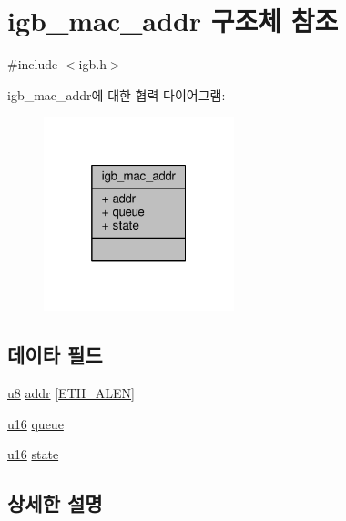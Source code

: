 \hypertarget{structigb__mac__addr}{}\section{igb\+\_\+mac\+\_\+addr 구조체 참조}
\label{structigb__mac__addr}


{\ttfamily \#include $<$igb.\+h$>$}



igb\+\_\+mac\+\_\+addr에 대한 협력 다이어그램\+:
\nopagebreak
\begin{figure}[H]
\begin{center}
\leavevmode
\includegraphics[width=157pt]{structigb__mac__addr__coll__graph}
\end{center}
\end{figure}
\subsection*{데이타 필드}
\begin{DoxyCompactItemize}
\item 
\hyperlink{lib_2igb_2e1000__osdep_8h_a8baca7e76da9e0e11ce3a275dd19130c}{u8} \hyperlink{structigb__mac__addr_ad0cb1fd890c452cd6b53222cc82474a4}{addr} \mbox{[}\hyperlink{avb__avtp_8h_a9822d89774e0d6ddaa06503950130423}{E\+T\+H\+\_\+\+A\+L\+EN}\mbox{]}
\item 
\hyperlink{lib_2igb_2e1000__osdep_8h_acdc9cf0314be0ae5a01d6d4379a95edd}{u16} \hyperlink{structigb__mac__addr_a4895577ef36597501c4510a0ff6cea06}{queue}
\item 
\hyperlink{lib_2igb_2e1000__osdep_8h_acdc9cf0314be0ae5a01d6d4379a95edd}{u16} \hyperlink{structigb__mac__addr_a070982b79bdea9f300a85500230fa22c}{state}
\end{DoxyCompactItemize}


\subsection{상세한 설명}


